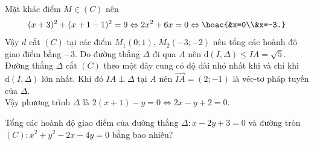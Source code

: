 \begin{ex}
{\begin{itemchoice}
			Mặt khác điểm $M\in (C)$  nên
			$$(x+3)^2+(x+1-1)^2=9 \Leftrightarrow 2x^2+6x=0  \Leftrightarrow \hoac{&x=0\\&x=-3.}$$
			Vậy $d$ cắt $(C)$ tại  các điểm $M_1(0;1)$, $M_2(-3;-2)$ nên tổng các hoành độ giao điểm bằng $-3$.
			\itemch Do  đường thẳng $\Delta$ đi qua $A$ nên $\mathrm{d}(I,\Delta)\leq IA=\sqrt{5}$.\\
			Đường thẳng $\Delta$ cắt $(C)$ theo một dây cung có độ dài nhỏ nhất khi và chỉ khi $\mathrm{d}(I,\Delta)$ lớn nhất. Khi đó $IA\perp \Delta$ tại $A$ nên $\overrightarrow{IA}=(2;-1)$ là  véc-tơ pháp tuyến của $\Delta$.\\
			Vậy  phương trình $\Delta$ là $2(x+1)-y=0 \Leftrightarrow 2x-y+2=0$.
		\end{itemchoice}
	 }
\end{ex}



\begin{bt}%
	Tổng các hoành độ giao điểm của đường thẳng $\Delta\colon x - 2y + 3 = 0$ và đường tròn $(C)\colon x^2 + y^2 -  2x - 4y = 0$ bằng bao nhiêu?
\end{bt}

